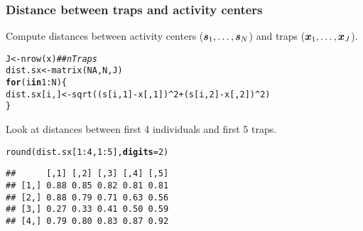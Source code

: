 \documentclass[color=usenames,dvipsnames]{beamer}\usepackage[]{graphicx}\usepackage[]{xcolor}
\makeatletter
\newcommand{\hlnum}[1]{\textcolor[rgb]{0.69,0.494,0}{#1}}%
\newcommand{\hlcom}[1]{\textcolor[rgb]{0.514,0.506,0.514}{\textit{#1}}}%
\newcommand{\hlopt}[1]{\textcolor[rgb]{0,0,0}{#1}}%
\newcommand{\hldef}[1]{\textcolor[rgb]{0,0,0}{#1}}%
\newcommand{\hlkwa}[1]{\textcolor[rgb]{0,0,0}{\textbf{#1}}}%
\newcommand{\hlkwb}[1]{\textcolor[rgb]{0,0.341,0.682}{#1}}%
\newcommand{\hlkwc}[1]{\textcolor[rgb]{0,0,0}{\textbf{#1}}}%
\newcommand{\hlkwd}[1]{\textcolor[rgb]{0.004,0.004,0.506}{#1}}%
\newenvironment{kframe}{%
 \def\at@end@of@kframe{}%
 \ifinner\ifhmode%
  \def\at@end@of@kframe{\end{minipage}}%
  \begin{minipage}{\columnwidth}%
 \fi\fi%
 \def\FrameCommand##1{\hskip\@totalleftmargin \hskip-\fboxsep
 \colorbox{shadecolor}{##1}\hskip-\fboxsep
     \hskip-\linewidth \hskip-\@totalleftmargin \hskip\columnwidth}%
 \MakeFramed {\advance\hsize-\width
   \@totalleftmargin\z@ \linewidth\hsize
   \@setminipage}}%
 {\par\unskip\endMakeFramed%
 \at@end@of@kframe}
\newenvironment{knitrout}{}{} %
\makeatother
\begin{document}
\begin{frame}[fragile]
  \frametitle{Distance between traps and activity centers}
  Compute distances between activity centers (${\bm s}_1, \dots, {\bm s}_N$)
  and traps (${\bm x}_1, \dots, {\bm x}_J$).
\begin{knitrout}\footnotesize
{}\color{fgcolor}\begin{kframe}
\begin{alltt}
\hldef{J} \hlkwb{<-} \hlkwd{nrow}\hldef{(x)}                 \hlcom{## nTraps}
\hldef{dist.sx} \hlkwb{<-} \hlkwd{matrix}\hldef{(}\hlnum{NA}\hldef{, N, J)}
\hlkwa{for}\hldef{(i} \hlkwa{in} \hlnum{1}\hlopt{:}\hldef{N) \{}
    \hldef{dist.sx[i,]} \hlkwb{<-} \hlkwd{sqrt}\hldef{((s[i,}\hlnum{1}\hldef{]}\hlopt{-}\hldef{x[,}\hlnum{1}\hldef{])}\hlopt{^}\hlnum{2} \hlopt{+} \hldef{(s[i,}\hlnum{2}\hldef{]}\hlopt{-}\hldef{x[,}\hlnum{2}\hldef{])}\hlopt{^}\hlnum{2}\hldef{)}
\hldef{\}}
\end{alltt}
\end{kframe}
\end{knitrout}
\pause
\vfill
  Look at distances between first 4 individuals and first 5 traps.
\begin{knitrout}\footnotesize
{}\color{fgcolor}\begin{kframe}
\begin{alltt}
\hlkwd{round}\hldef{(dist.sx[}\hlnum{1}\hlopt{:}\hlnum{4}\hldef{,}\hlnum{1}\hlopt{:}\hlnum{5}\hldef{],} \hlkwc{digits}\hldef{=}\hlnum{2}\hldef{)}
\end{alltt}
\begin{verbatim}
##      [,1] [,2] [,3] [,4] [,5]
## [1,] 0.88 0.85 0.82 0.81 0.81
## [2,] 0.88 0.79 0.71 0.63 0.56
## [3,] 0.27 0.33 0.41 0.50 0.59
## [4,] 0.79 0.80 0.83 0.87 0.92
\end{verbatim}
\end{kframe}
\end{knitrout}

\end{frame}
\end{document}
